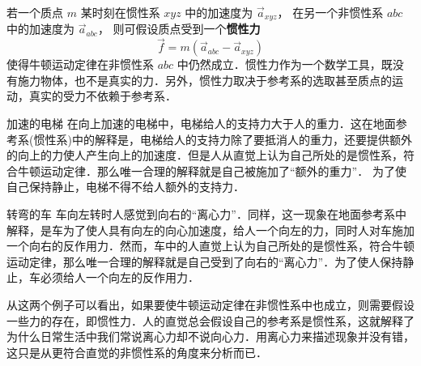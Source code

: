 

若一个质点 $m$ 某时刻在惯性系 $xyz$ 中的加速度为 $\vec a_{xyz}$， 在另一个非惯性系 $abc$ 中的加速度为 $\vec a_{abc}$， 则可假设质点受到一个\textbf{惯性力}
\begin{equation}
\vec f = m( \vec a_{abc} - \vec a_{xyz} )
\end{equation}
使得牛顿运动定律在非惯性系 $abc$ 中仍然成立．惯性力作为一个数学工具，既没有施力物体，也不是真实的力．另外，惯性力取决于参考系的选取甚至质点的运动，真实的受力不依赖于参考系．

\begin{exam}{加速的电梯}\label{Iner_ex1}
在向上加速的电梯中，电梯给人的支持力大于人的重力．这在地面参考系(惯性系)中的解释是，电梯给人的支持力除了要抵消人的重力，还要提供额外的向上的力使人产生向上的加速度．但是人从直觉上认为自己所处的是惯性系，符合牛顿运动定律．那么唯一合理的解释就是自己被施加了“额外的重力”． 为了使自己保持静止，电梯不得不给人额外的支持力．
\end{exam}

\begin{exam}{转弯的车}
车向左转时人感觉到向右的“离心力”．同样，这一现象在地面参考系中解释，是车为了使人具有向左的向心加速度，给人一个向左的力，同时人对车施加一个向右的反作用力．然而，车中的人直觉上认为自己所处的是惯性系，符合牛顿运动定律，那么唯一合理的解释就是自己受到了向右的“离心力”．为了使人保持静止，车必须给人一个向左的反作用力．
\end{exam}

从这两个例子可以看出，如果要使牛顿运动定律在非惯性系中也成立，则需要假设一些力的存在，即惯性力．人的直觉总会假设自己的参考系是惯性系，这就解释了为什么日常生活中我们常说离心力却不说向心力．用离心力来描述现象并没有错，这只是从更符合直觉的非惯性系的角度来分析而已．

